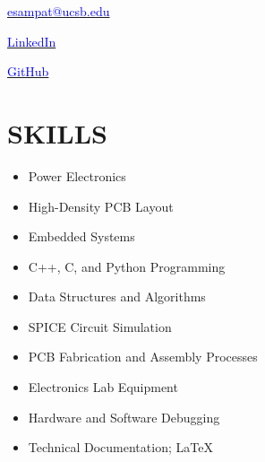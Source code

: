 

	\maketitle
	
	\begin{center}
		\begin{minipage}{0.33\textwidth}
			\centering \href{esampat@ucsb.edu}{\textcolor{blue}{esampat@ucsb.edu}}
		\end{minipage}%
		\begin{minipage}{0.33\textwidth}
			\centering \href{https://www.linkedin.com/in/erk-sampat-500331245/}{\textcolor{blue}{LinkedIn}}
		\end{minipage}%
		\begin{minipage}{0.33\textwidth}
			\centering \href{https://github.com/SAR-mango}{\textcolor{blue}{GitHub}}
		\end{minipage}
	\end{center}
	
	\section*{SKILLS}
	\begin{minipage}{0.5\textwidth}
		\centering
		\begin{itemize}
			\setlength \itemsep{0.1em}
			\item Power Electronics
			\item High-Density PCB Layout
			\item Embedded Systems
			\item C++, C, and Python Programming
			\item Data Structures and Algorithms
		\end{itemize}
	\end{minipage}%
	\begin{minipage}{0.5\textwidth}
		\centering
		\begin{itemize}
			\setlength \itemsep{0.1em}
			\item SPICE Circuit Simulation
			\item PCB Fabrication and Assembly Processes
			\item Electronics Lab Equipment
			\item Hardware and Software Debugging
			\item Technical Documentation; LaTeX
		\end{itemize}
	\end{minipage}
	
